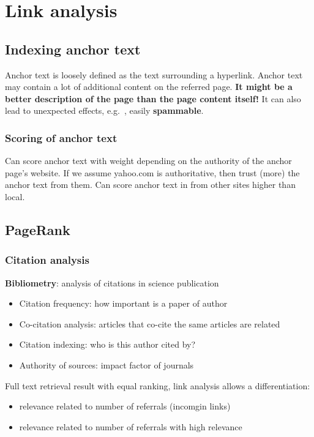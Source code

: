 \section{Link analysis}
\subsection{Indexing anchor text}

Anchor text is loosely defined as the text surrounding a hyperlink.
Anchor text may contain a lot of additional content on the referred
page. \textbf{It might be a better description of the page than the
  page content itself!}
It can also lead to unexpected effects, e.g.\ , easily
\textbf{spammable}.

\subsubsection{Scoring of anchor text}
Can score anchor text with weight depending on the authority of the
anchor page's website.
If we assume yahoo.com is authoritative, then trust (more) the anchor
text from them.
Can score anchor text in from other sites higher than local.

\subsection{PageRank}

\subsubsection{Citation analysis}
\textbf{Bibliometry}: analysis of citations in science publication
\begin{itemize}
\item Citation frequency: how important is a paper of author
\item Co-citation analysis: articles that co-cite the same articles
  are related
\item Citation indexing: who is this author cited by?
\item Authority of sources: impact factor of journals
\end{itemize}

Full text retrieval result with equal ranking, link analysis allows a
differentiation:
\begin{itemize}
\item relevance related to number of referrals (incomgin links)
\item relevance related to number of referrals with high relevance
\end{itemize}


